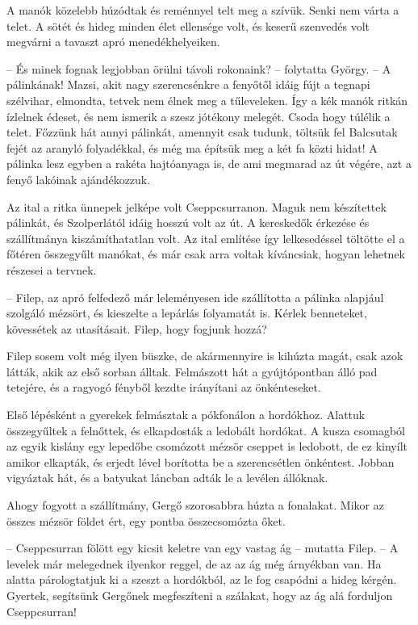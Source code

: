 \documentclass[10pt]{memoir}
\begin{document}
A manók közelebb húzódtak és reménnyel telt meg a szívük. Senki nem várta a
telet. A sötét és hideg minden élet ellensége volt, és keserű szenvedés volt
megvárni a tavaszt apró menedékhelyeiken.

-- És minek fognak legjobban örülni távoli rokonaink? -- folytatta György.
-- A pálinkának! Mazsi, akit nagy szerencsénkre a fenyőtől idáig fújt a
tegnapi szélvihar, elmondta, tetvek nem élnek meg a tűleveleken. Így a kék
manók ritkán ízlelnek édeset, és nem ismerik a szesz jótékony melegét. Csoda
hogy túlélik a telet. Főzzünk hát annyi pálinkát, amennyit csak tudunk, töltsük
fel Balcsutak fejét az aranyló folyadékkal, és még ma építsük meg a két fa
közti hidat! A pálinka lesz egyben a rakéta hajtóanyaga is, de ami megmarad az
út végére, azt a fenyő lakóinak ajándékozzuk.

Az ital a ritka ünnepek jelképe volt Cseppcsurranon. Maguk nem készítettek
pálinkát, és Szolperlától idáig hosszú volt az út. A kereskedők érkezése és
szállítmánya kiszámíthatatlan volt. Az ital említése így lelkesedéssel töltötte
el a főtéren összegyűlt manókat, és már csak arra voltak kíváncsiak, hogyan
lehetnek részesei a tervnek.

-- Filep, az apró felfedező már leleményesen ide szállította a pálinka
alapjául szolgáló mézsört, és kieszelte a lepárlás folyamatát is. Kérlek
benneteket, kövessétek az utasításait. Filep, hogy fogjunk hozzá?

Filep sosem volt még ilyen büszke, de akármennyire is kihúzta magát, csak azok
látták, akik az első sorban álltak. Felmászott hát a gyújtópontban álló pad
tetejére, és a ragyogó fényből kezdte irányítani az önkénteseket.

Első lépésként a gyerekek felmásztak a pókfonálon a hordókhoz. Alattuk
összegyűltek a felnőttek, és elkapdosták a ledobált hordókat. A kusza csomagból
az egyik kislány egy lepedőbe csomózott mézsör cseppet is ledobott, de ez
kinyílt amikor elkapták, és erjedt lével borította be a szerencsétlen
önkéntest. Jobban vigyáztak hát, és a batyukat láncban adták le a levélen
állóknak.

Ahogy fogyott a szállítmány, Gergő szorosabbra húzta a fonalakat. Mikor az
összes mézsör földet ért, egy pontba összecsomózta őket.

-- Cseppcsurran fölött egy kicsit keletre van egy vastag ág -- mutatta Filep.
-- A levelek már melegednek ilyenkor reggel, de az az ág még árnyékban van. Ha
alatta párologtatjuk ki a szeszt a hordókból, az le fog csapódni a hideg
kérgén. Gyertek, segítsünk Gergőnek megfeszíteni a szálakat, hogy az ág alá
forduljon Cseppcsurran!
\end{document}
